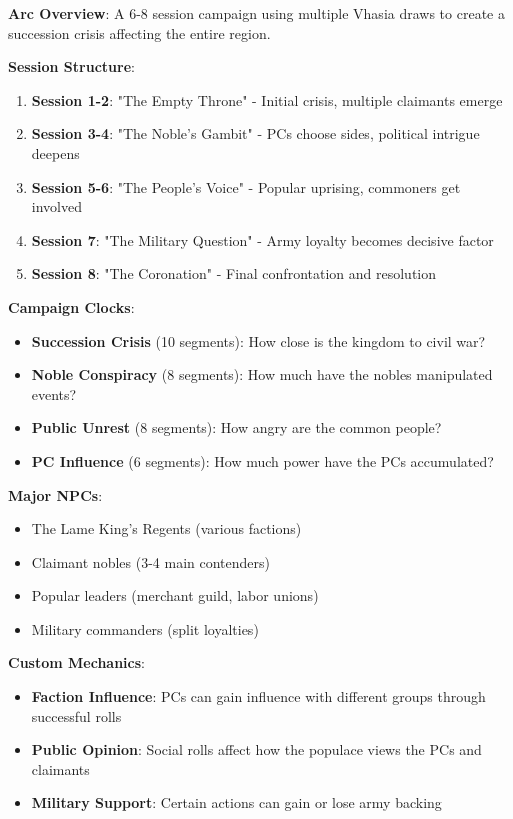 \documentclass[11pt]{article}
\begin{document}
\begin{mdframed}[backgroundcolor=modulebg]
\textbf{Arc Overview}: A 6-8 session campaign using multiple Vhasia draws to create a succession crisis affecting the entire region.

\textbf{Session Structure}:
\begin{enumerate}[leftmargin=*]
\item \textbf{Session 1-2}: "The Empty Throne" - Initial crisis, multiple claimants emerge
\item \textbf{Session 3-4}: "The Noble's Gambit" - PCs choose sides, political intrigue deepens  
\item \textbf{Session 5-6}: "The People's Voice" - Popular uprising, commoners get involved
\item \textbf{Session 7}: "The Military Question" - Army loyalty becomes decisive factor
\item \textbf{Session 8}: "The Coronation" - Final confrontation and resolution
\end{enumerate}

\textbf{Campaign Clocks}:
\begin{itemize}[leftmargin=*]
\item \textbf{Succession Crisis} (10 segments): How close is the kingdom to civil war?
\item \textbf{Noble Conspiracy} (8 segments): How much have the nobles manipulated events?
\item \textbf{Public Unrest} (8 segments): How angry are the common people?
\item \textbf{PC Influence} (6 segments): How much power have the PCs accumulated?
\end{itemize}

\textbf{Major NPCs}:
\begin{itemize}[leftmargin=*]
\item The Lame King's Regents (various factions)
\item Claimant nobles (3-4 main contenders)
\item Popular leaders (merchant guild, labor unions)
\item Military commanders (split loyalties)
\end{itemize}

\textbf{Custom Mechanics}:
\begin{itemize}[leftmargin=*]
\item \textbf{Faction Influence}: PCs can gain influence with different groups through successful rolls
\item \textbf{Public Opinion}: Social rolls affect how the populace views the PCs and claimants
\item \textbf{Military Support}: Certain actions can gain or lose army backing
\end{itemize}


\end{mdframed}
\end{document}
